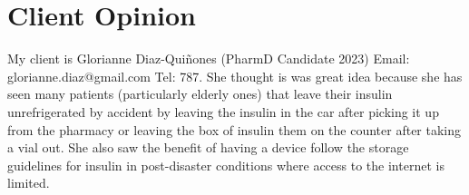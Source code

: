 \section{Client Opinion}
My client is Glorianne Diaz-Quiñones (PharmD Candidate 2023) Email: glorianne.diaz@gmail.com Tel: 787. She thought is was great idea because she has seen many patients (particularly elderly ones) that leave their insulin unrefrigerated by accident by leaving the insulin in the car after picking it up from the pharmacy or leaving the box of insulin them on the counter after taking a vial out. She also saw the benefit of having a device follow the storage guidelines for insulin in post-disaster conditions where access to the internet is limited.
